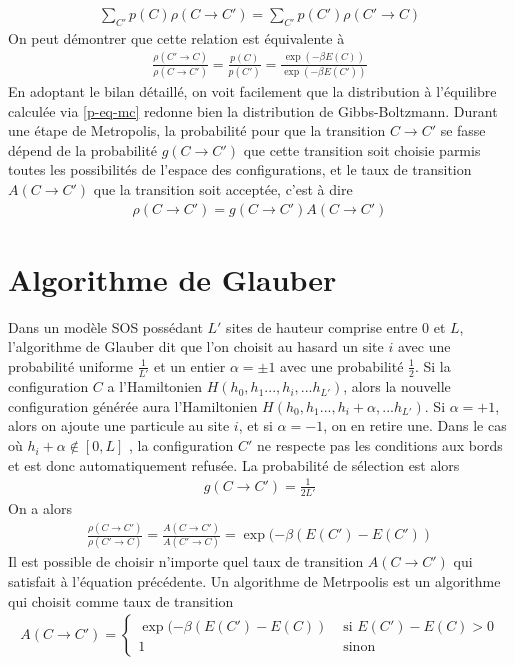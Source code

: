 \begin{align}
    \sum_{C'} p(C) \rho(C \to C') = \sum_{C'} p(C') \rho(C' \to C)
\end{align}
On peut démontrer que cette relation est équivalente à \cite{newman_monte_1999} 
\begin{align}
    \frac{\rho(C'\to C)}{\rho(C \to C')} = \frac{p(C)}{p(C')} = \frac{\exp(-\beta E(C))}{\exp(-\beta E(C'))}
\end{align} 
En adoptant le bilan détaillé, on voit facilement que la distribution à l'équilibre calculée via \ref{p-eq-mc} redonne bien la distribution de Gibbs-Boltzmann.
Durant une étape de Metropolis, la probabilité pour que la transition $C\to C'$ se fasse dépend de la probabilité $g(C\to C')$ que cette transition soit choisie parmis toutes les possibilités de l'espace des configurations, et le taux de transition $A(C \to C')$ que la transition soit acceptée, c'est à dire
\begin{align}
    \rho(C\to C') = g(C\to C') A(C \to C')
\end{align}

    \section{Algorithme de Glauber}
Dans un modèle SOS possédant $L'$ sites de hauteur comprise entre $0$ et $L$, l'algorithme de Glauber\cite{glauber_timedependent_1963} dit que l'on choisit au hasard un site $i$ avec une probabilité uniforme $\frac{1}{L'}$ et un entier $\alpha = \pm 1$ avec une probabilité $\frac{1}{2}$. Si la configuration $C$ a l'Hamiltonien $H(h_0,h_1...,h_i,...h_{L'})$, alors la nouvelle configuration générée aura l'Hamiltonien $H(h_0,h_1...,h_i+\alpha,...h_{L'})$.
Si $\alpha=+1$, alors on ajoute une particule au site $i$, et si $\alpha=-1$, on en retire une. Dans le cas où $h_i+\alpha \not\in [0,L]$ , la configuration $C'$ ne respecte pas les conditions aux bords et est donc automatiquement refusée.
La probabilité de sélection est alors 
\begin{align}
    g(C\to C') = \frac{1}{2L'}
\end{align}
On a alors
\begin{align}
    \frac{\rho(C\to C')}{\rho(C' \to C)} = \frac{A(C\to C')}{A(C'\to C)} = \exp(-\beta (E(C')-E(C'))
\end{align}
Il est possible de choisir n'importe quel taux de transition $A(C\to C')$ qui satisfait à l'équation précédente. Un algorithme de Metrpoolis est un algorithme qui choisit comme taux de transition 
\begin{align}
    A(C\to C') = \begin{cases} \exp(-\beta (E(C')-E(C)) &\text{ si } E(C')-E(C) \greater 0 \\
             1 &\text{ sinon} \end{cases}
    \label{taux-transition-metropolis}
\end{align}

